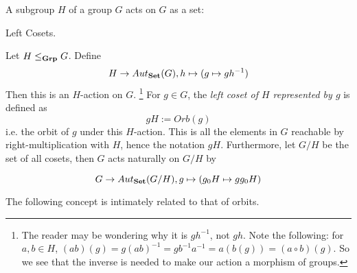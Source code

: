 \documentclass[../../book.tex]{subfiles}
\begin{document}


A subgroup $H$ of a group $G$ acts on $G$ as a set: 

\begin{dfn} Left Cosets. 

    Let $H \leq_{\mathbf{Grp}} G$. 
    Define 
    \[H \to Aut_{\mathbf{Set}}(G), h \mapsto (g \mapsto gh^{-1})\]
    Then this is an $H$-action on $G$. \footnote{
        The reader may be wondering why it is $gh^{-1}$, not $gh$.
        Note the following: for $a, b \in H$, 
        $(ab)(g) = g(ab)^{-1} = gb^{-1}a^{-1} = a(b(g)) = (a \circ b)(g)$.
        So we see that the inverse is needed to make our action a morphism of groups.
    }
    For $g \in G$, 
    the \emph{left coset of $H$ represented by $g$} is defined as
    \[gH := Orb(g)\]
    i.e. the orbit of $g$ under this $H$-action. 
    This is all the elements in $G$ reachable by 
    right-multiplication with $H$, hence the notation $gH$. 
    Furthermore, let $G / H$ be the set of all cosets, 
    then $G$ acts naturally on $G / H$ by
    
    \[G \to Aut_{\mathbf{Set}}(G / H), g \mapsto (g_0H \mapsto gg_0H)\]
\end{dfn}

The following concept is intimately related to that of orbits. 
\end{document}
